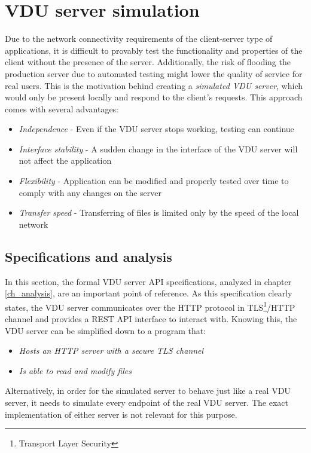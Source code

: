 \section{VDU server simulation}
Due to the network connectivity requirements of the client-server type of applications, it is difficult to provably test the functionality and properties of the client without the presence of the server. Additionally, the risk of flooding the production server due to automated testing might lower the quality of service for real users. This is the motivation behind creating a \textit{simulated VDU server}, which would only be present locally and respond to the client's requests. This approach comes with several advantages:
\begin{itemize}
    \item \textit{Independence} - Even if the VDU server stops working, testing can continue
    \item \textit{Interface stability} - A sudden change in the interface of the VDU server will not affect the application
    \item \textit{Flexibility} - Application can be modified and properly tested over time to comply with any changes on the server
    \item \textit{Transfer speed} - Transferring of files is limited only by the speed of the local network
\end{itemize}

\subsection{Specifications and analysis}
In this section, the formal VDU server API specifications, analyzed in chapter \ref{ch_analysis}, are an important point of reference. As this specification clearly states, the VDU server communicates over the HTTP protocol in TLS\footnote{Transport Layer Security}/HTTP channel and provides a REST API interface to interact with. Knowing this, the VDU server can be simplified down to a program that:
\begin{itemize}
    \item \textit{Hosts an HTTP server with a secure TLS channel}
    \item \textit{Is able to read and modify files}
\end{itemize}
Alternatively, in order for the simulated server to behave just like a real VDU server, it needs to simulate every endpoint of the real VDU server. The exact implementation of either server is not relevant for this purpose.

